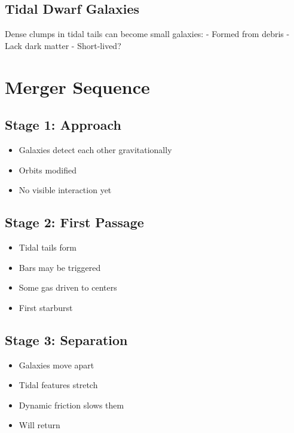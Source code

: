 \documentclass[
  11pt,
  letterpaper,
  twoside,
  openright]{book}
\providecommand{\tightlist}{%
  \setlength{\itemsep}{0pt}\setlength{\parskip}{0pt}}
\begin{document}
\subsection{Tidal Dwarf Galaxies}\label{tidal-dwarf-galaxies}

Dense clumps in tidal tails can become small galaxies: - Formed from
debris - Lack dark matter - Short-lived?

\section{Merger Sequence}\label{merger-sequence}

\subsection{Stage 1: Approach}\label{stage-1-approach}

\begin{itemize}
\tightlist
\item
  Galaxies detect each other gravitationally
\item
  Orbits modified
\item
  No visible interaction yet
\end{itemize}

\subsection{Stage 2: First Passage}\label{stage-2-first-passage}

\begin{itemize}
\tightlist
\item
  Tidal tails form
\item
  Bars may be triggered
\item
  Some gas driven to centers
\item
  First starburst
\end{itemize}

\subsection{Stage 3: Separation}\label{stage-3-separation}

\begin{itemize}
\tightlist
\item
  Galaxies move apart
\item
  Tidal features stretch
\item
  Dynamic friction slows them
\item
  Will return
\end{itemize}
\end{document}
